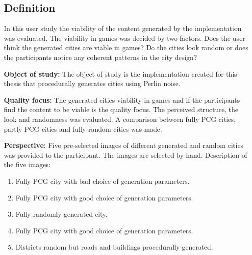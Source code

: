 	\subsection{Definition}
	In this user study the viability of the content generated by the implementation was evaluated.  The viability in games was decided by two factors. Does the user think the generated cities are viable in games? Do the cities look random or does the participants notice any coherent patterns in the city design?
			
		
		
	\par
	\textbf{Object of study:}
	The object of study is the implementation created for this thesis that procedurally generates cities using Perlin noise.
			
	\par
	\textbf{Quality focus:}
	The generated cities viability in games and if the participants find the content to be viable is the quality focus. The perceived structure, the look and randomness was evaluated. A comparison between fully PCG cities, partly PCG cities and fully random cities was made.
			
	\par
	\textbf{Perspective:}
	Five pre-selected images of different generated and random cities was provided to the participant. The images are selected by hand. Description of the five images:
	
	\begin{enumerate}
		\item Fully PCG city with bad choice of generation parameters.
		\item Fully PCG city with good choice of generation parameters.
		\item Fully randomly generated city.
		\item Fully PCG city with good choice of generation parameters.
		\item Districts random but roads and buildings procedurally generated.
	\end{enumerate}
			

